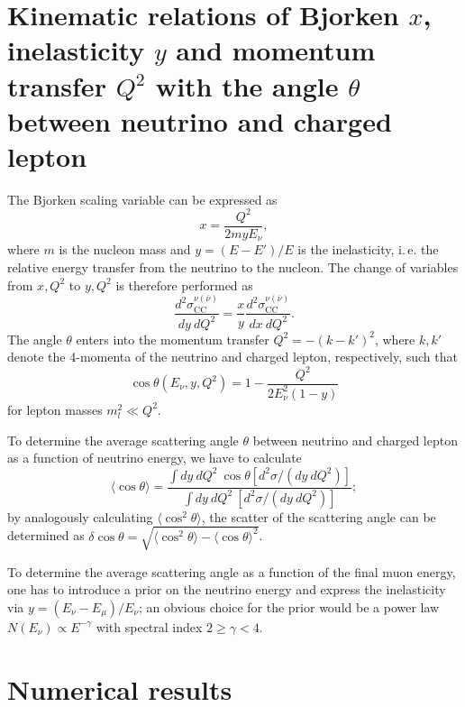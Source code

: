 \documentclass[a4paper]{article}
\begin{document}
\section{Kinematic relations of Bjorken $x$, inelasticity $y$ and momentum
  transfer $Q^2$ with the angle $\theta$ between neutrino and charged lepton}
The Bjorken scaling variable can be expressed as
\begin{equation}
  x = \frac{Q^2}{2 m y E_\nu},
\end{equation}
where $m$ is the nucleon mass and $y = (E - E')/E$ is the inelasticity, i.\,e.
the relative energy transfer from the neutrino to the nucleon. The change of
variables from $x, Q^2$ to $y, Q^2$ is therefore performed as
\begin{equation}
  \frac{d^2 \sigma_\text{CC}^{\nu (\overline \nu)}}{dy\ dQ^2} =
  \frac{x}{y} \frac{d^2 \sigma_\text{CC}^{\nu (\overline \nu)}}{dx\ dQ^2}.
\end{equation}
The angle $\theta$ enters into the momentum transfer
 $Q^2 = -(k - k')^2$, where $k, k'$ denote the 4-momenta of the neutrino and
charged lepton, respectively, such that
\begin{equation}
  \cos \theta (E_\nu, y, Q^2) = 1 - \frac{Q^2}{2 E_\nu^2 (1 - y)}
\end{equation}
for lepton masses $m_l^2 \ll Q^2$.

To determine the average scattering angle $\theta$ between neutrino and charged
lepton as a function of neutrino energy, we have to calculate
\begin{equation}
  \langle \cos\theta\rangle = \frac{\int dy\ dQ^2\ \cos \theta
    [d^2\sigma/(dy\ dQ^2)]}{\int dy\ dQ^2\ [d^2\sigma/(dy\ dQ^2)]};
\end{equation}
by analogously calculating $\langle \cos^2 \theta\rangle$, the scatter of the
scattering angle can be determined as $\delta \cos \theta = \sqrt{\langle \cos^2
\theta\rangle - \langle \cos \theta\rangle^2}$.

To determine the average scattering angle as a function of the final muon
energy, one has to introduce a prior on the neutrino energy and express the
inelasticity via $y = (E_\nu - E_\mu)/E_\nu$; an obvious choice for the prior
would be a power law $N(E_\nu) \propto E^{-\gamma}$ with spectral index $2 \geq
\gamma < 4$.

\section{Numerical results}


\end{document}
